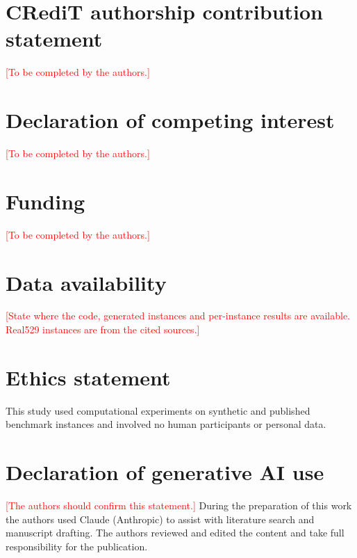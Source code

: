 \documentclass[preprint,12pt,authoryear]{elsarticle}
\newcommand{\placeholder}[1]{\textcolor{red}{[#1]}}
\begin{document}
\section*{CRediT authorship contribution statement}
\placeholder{To be completed by the authors.}

\section*{Declaration of competing interest}
\placeholder{To be completed by the authors.}

\section*{Funding}
\placeholder{To be completed by the authors.}

\section*{Data availability}
\placeholder{State where the code, generated instances and per-instance results are available. Real529 instances are from the cited sources.}

\section*{Ethics statement}
This study used computational experiments on synthetic and published benchmark instances and involved no human participants or personal data.

\section*{Declaration of generative AI use}
\placeholder{The authors should confirm this statement.} During the preparation of this work the authors used Claude (Anthropic) to assist with literature search and manuscript drafting. The authors reviewed and edited the content and take full responsibility for the publication.



\end{document}
